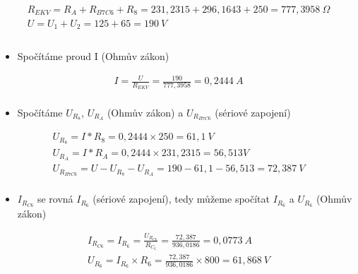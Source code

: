 \begin{center}
    \begin{gather*}
        R_{EKV} = R_A + R_{B7C6} + R_8 = 231,2315 + 296,1643 + 250 = 777,3958 \: \Omega \\
        U = U_1 + U_2 = 125 + 65 = 190 \: V \\\\
    \end{gather*}
\end{center}

\begin{itemize}
    \item Spočítáme proud I (Ohmův zákon)
\end{itemize}

\begin{center}
    \begin{gather*}
        I = \frac{U}{R_{EKV}} = \frac{190}{777,3958} = 0,2444 \: A \\
    \end{gather*}
\end{center}

\begin{itemize}
    \item Spočítáme $U_{R_8}$, $U_{R_A}$ (Ohmův zákon) a $U_{R_{B7C6}}$ (sériové zapojení)
\end{itemize}

\begin{center}
    \begin{gather*}
        U_{R_8} = I * R_8 = 0,2444 \times 250 = 61,1 \: V \\
        U_{R_A} = I * R_A = 0,2444 \times 231,2315 = 56,513 V \: \\
        U_{R_{B7C6}} = U - U_{R_8} - U_{R_A} = 190 - 61,1 - 56,513 = 72,387 \: V \\
    \end{gather*}
\end{center}

\begin{itemize}
    \item $I_{R_{C6}}$ se rovná $I_{R_6}$ (sériové zapojení), tedy můžeme spočítat $I_{R_6}$ a $U_{R_6}$ (Ohmův zákon)
\end{itemize}

\begin{center}
    \begin{gather*}
        I_{R_{C6}} = I_{R_6} = \frac{U_{R_{C6}}}{R_{C_6}} = \frac{72,387}{936,0186} = 0,0773 \: A \\[6pt]
        U_{R_6} = I_{R_6} \times R_6 = \frac{72,387}{936,0186} \times 800 = 61,868 \: V
    \end{gather*}
\end{center}
